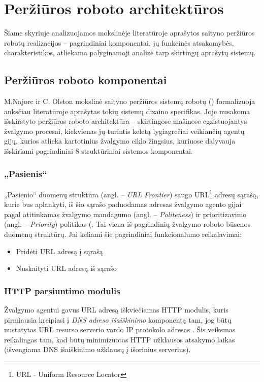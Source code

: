 \section{Peržiūros roboto architektūros}

Šiame skyriuje analizuojamos mokslinėje literatūroje aprašytos saityno peržiūros robotų realizacijos -- pagrindiniai komponentai, jų funkcinės atsakomybės, charakteristikos, atliekama palyginamoji analizė tarp skirtingų aprašytų sistemų.

\subsection{Peržiūros roboto komponentai}

M.Najorc ir C. Olston mokslinė saityno peržiūros sistemų robotų (\cite{StanfWebCrawl}) formalizuoja anksčiau literatūroje aprašytas tokių sistemų dizaino specifikas. Joje nusakoma išskirstyto peržiūros roboto architektūra -- skirtingose mašinose egzistuojantys žvalgymo procesai, kiekvienas jų turintis keletą lygiagrečiai veikiančių agentų gijų, kurios atlieka kartotinius žvalgymo ciklo žingsius, kuriuose dalyvauja išskiriami pagrindiniai 8 struktūriniai sistemos komponentai.

\subsubsection{„Pasienis“}

„Pasienio“ duomenų struktūra (angl. -- \textit{URL Frontier}) saugo URL\footnote{URL - Uniform Resource Locator} adresų sąrašą, kurie bus aplankyti, iš šio sąrašo paduodamas adresas žvalgymo agento gijai pagal atitinkamas žvalgymo mandagumo (angl. -- \textit{Politeness}) ir prioritizavimo (angl. -- \textit{Priority}) politikas (\cite{StanfWebCrawl}. Tai viena iš pagrindinių žvalgymo roboto būsenos duomenų struktūrų. Jai keliami šie pagrindiniai funkcionalumo reikalavimai:
\begin{itemize}
    \item Pridėti URL adresą į sąrašą
    \item Nuskaityti URL adresą iš sąrašo
\end{itemize}

\subsubsection{HTTP parsiuntimo modulis}

Žvalgymo agentui gavus URL adresą iškviečiamas HTTP modulis, kuris pirmiausia kreipiasi į \textit{DNS adreso išaiškinimo} komponentą tam, jog būtų nustatytas URL resurso serverio vardo IP protokolo adresas \cite{StanfWebCrawl}. Šis veiksmas reikalingas tam, kad būtų minimizuotas HTTP užklausos atsakymo laikas (išvengiama DNS išaiškinimo užklausų į išorinius serverius).

